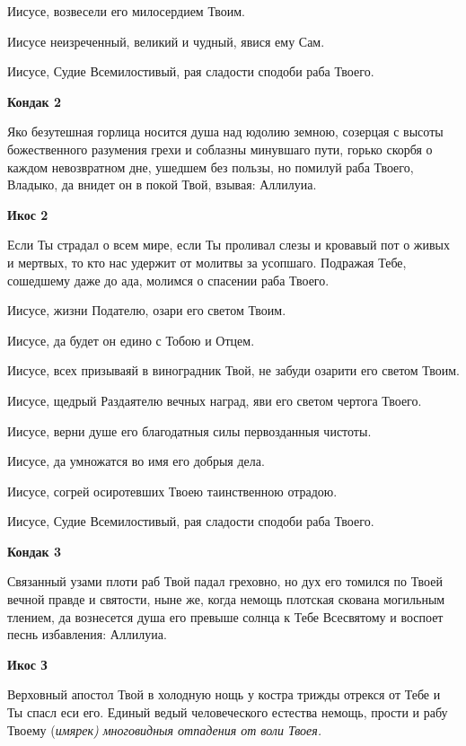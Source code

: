 Иисусе, возвесели его милосердием Твоим. 

Иисусе неизреченный, великий и чудный, явися ему Сам. 

Иисусе, Судие Всемилостивый, рая сладости сподоби раба Твоего.


\medskip


\bfseries Кондак 2\normalfont{}


Яко безутешная горлица носится душа над юдолию земною, созерцая с высоты божественного разумения грехи и соблазны минувшаго пути, горько скорбя о каждом невозвратном дне, ушедшем без пользы, но помилуй раба Твоего, Владыко, да внидет он в покой Твой, взывая: Аллилуиа.


\medskip


\bfseries Икос 2\normalfont{}


Если Ты страдал о всем мире, если Ты проливал слезы и кровавый пот о живых и мертвых, то кто нас удержит от молитвы за усопшаго. Подражая Тебе, сошедшему даже до ада, молимся о спасении раба Твоего. 

Иисусе, жизни Подателю, озари его светом Твоим. 

Иисусе, да будет он едино с Тобою и Отцем. 

Иисусе, всех призываяй в виноградник Твой, не забуди озарити его светом Твоим. 

Иисусе, щедрый Раздаятелю вечных наград, яви его светом чертога Твоего. 

Иисусе, верни душе его благодатныя силы первозданныя чистоты. 

Иисусе, да умножатся во имя его добрыя дела. 

Иисусе, согрей осиротевших Твоею таинственною отрадою. 

Иисусе, Судие Всемилостивый, рая сладости сподоби раба Твоего.


\medskip


\bfseries Кондак 3\normalfont{}


Связанный узами плоти раб Твой падал греховно, но дух его томился по Твоей вечной правде и святости, ныне же, когда немощь плотская скована могильным тлением, да вознесется душа его превыше солнца к Тебе Всесвятому и воспоет песнь избавления: Аллилуиа.


\medskip


\bfseries Икос З\normalfont{}


Верховный апостол Твой в холодную нощь у костра трижды отрекся от Тебе и Ты спасл еси его. Единый ведый человеческого естества немощь, прости и рабу Твоему (\itshape имярек\normalfont{}) многовидныя отпадения от воли Твоея. 

